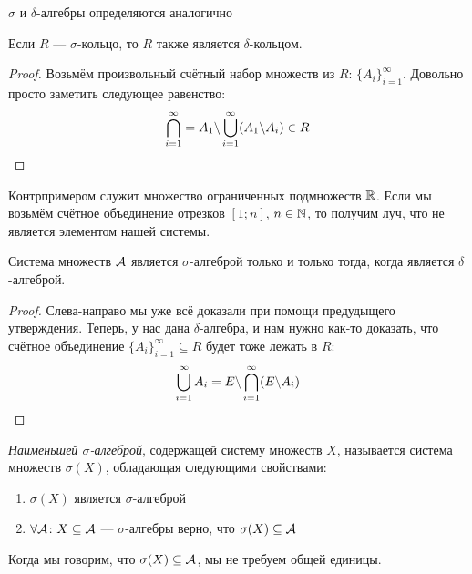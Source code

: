 \begin{note}
	$\sigma$ и $\delta$-алгебры определяются аналогично
\end{note}

\begin{proposition}
	Если $R$ --- $\sigma$-кольцо, то $R$ также является $\delta$-кольцом.
\end{proposition}

\begin{proof}
	Возьмём произвольный счётный набор множеств из $R$: $\{A_i\}_{i = 1}^\infty$. Довольно просто заметить следующее равенство:
	\[
		\bigcap_{i = 1}^\infty = A_1 \backslash \bigcup_{i = 1}^\infty (A_1 \backslash A_i) \in R
	\]
\end{proof}

\begin{note}
	Контрпримером служит множество ограниченных подмножеств $\mathbb{R}$. Если мы возьмём счётное объединение отрезков $[1; n]$, $n \in \mathbb{N}$, то получим луч, что не является элементом нашей системы.
\end{note}

\begin{proposition}
	Система множеств $\mathcal{A}$ является $\sigma$-алгеброй только и только тогда, когда является $\delta$-алгеброй.
\end{proposition}

\begin{proof}
	Слева-направо мы уже всё доказали при помощи предудыщего утверждения. Теперь, у нас дана $\delta$-алгебра, и нам нужно как-то доказать, что счётное объединение $\{A_i\}_{i = 1}^\infty \subseteq R$ будет тоже лежать в $R$:
	\[
		\bigcup_{i = 1}^\infty A_i = E \backslash \bigcap_{i = 1}^\infty (E \backslash A_i)
	\]
\end{proof}

\begin{definition}
	\textit{Наименьшей $\sigma$-алгеброй}, содержащей систему множеств $X$, называется система множеств $\sigma(X)$, обладающая следующими свойствами:
	\begin{enumerate}
		\item $\sigma(X)$ является $\sigma$-алгеброй
		
		\item $\forall \mathcal{A} \colon X \subseteq \mathcal{A}$ --- $\sigma$-алгебры верно, что $\sigma(X) \subseteq \mathcal{A}$
	\end{enumerate}
\end{definition}

\begin{note}
	Когда мы говорим, что $\sigma(X) \subseteq \mathcal{A}$, мы не требуем общей единицы.
\end{note}

